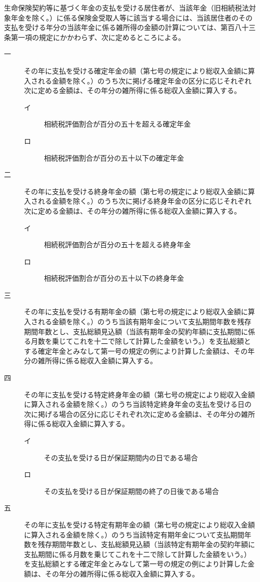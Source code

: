 \documentclass[twocolumn,a4j,10pt]{ltjtarticle}
\begin{document}
\begin{description}
\begin{description}
\end{description}
\item[\rensuji{2}]生命保険契約等に基づく年金の支払を受ける居住者が、当該年金（旧相続税法対象年金を除く。）に係る保険金受取人等に該当する場合には、当該居住者のその支払を受ける年分の当該年金に係る雑所得の金額の計算については、第百八十三条第一項の規定にかかわらず、次に定めるところによる。
\begin{description}
\item[一]その年に支払を受ける確定年金の額（第七号の規定により総収入金額に算入される金額を除く。）のうち次に掲げる確定年金の区分に応じそれぞれ次に定める金額は、その年分の雑所得に係る総収入金額に算入する。
\begin{description}
\item[イ]相続税評価割合が百分の五十を超える確定年金
\item[ロ]相続税評価割合が百分の五十以下の確定年金
\end{description}
\item[二]その年に支払を受ける終身年金の額（第七号の規定により総収入金額に算入される金額を除く。）のうち次に掲げる終身年金の区分に応じそれぞれ次に定める金額は、その年分の雑所得に係る総収入金額に算入する。
\begin{description}
\item[イ]相続税評価割合が百分の五十を超える終身年金
\item[ロ]相続税評価割合が百分の五十以下の終身年金
\end{description}
\item[三]その年に支払を受ける有期年金の額（第七号の規定により総収入金額に算入される金額を除く。）のうち当該有期年金について支払期間年数を残存期間年数とし、支払総額見込額（当該有期年金の契約年額に支払期間に係る月数を乗じてこれを十二で除して計算した金額をいう。）を支払総額とする確定年金とみなして第一号の規定の例により計算した金額は、その年分の雑所得に係る総収入金額に算入する。
\item[四]その年に支払を受ける特定終身年金の額（第七号の規定により総収入金額に算入される金額を除く。）のうち当該特定終身年金の支払を受ける日の次に掲げる場合の区分に応じそれぞれ次に定める金額は、その年分の雑所得に係る総収入金額に算入する。
\begin{description}
\item[イ]その支払を受ける日が保証期間内の日である場合
\item[ロ]その支払を受ける日が保証期間の終了の日後である場合
\end{description}
\item[五]その年に支払を受ける特定有期年金の額（第七号の規定により総収入金額に算入される金額を除く。）のうち当該特定有期年金について支払期間年数を残存期間年数とし、支払総額見込額（当該特定有期年金の契約年額に支払期間に係る月数を乗じてこれを十二で除して計算した金額をいう。）を支払総額とする確定年金とみなして第一号の規定の例により計算した金額は、その年分の雑所得に係る総収入金額に算入する。

\end{description}
\end{description}
\end{document}
